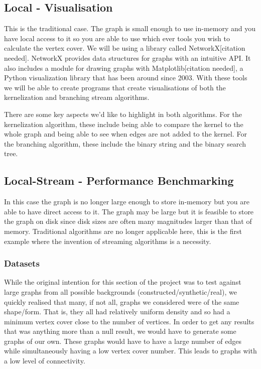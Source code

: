 \subsection{Local - Visualisation}

This is the traditional case. The graph is small enough to use in-memory
and you have local access to it so you are able to use which ever tools
you wish to calculate the vertex cover. We will be using a library
called NetworkX{[}citation needed{]}. NetworkX provides data structures
for graphs with an intuitive API. It also includes a module for drawing
graphs with Matplotlib{[}citation needed{]}, a Python visualization
library that has been around since 2003. With these tools we will be
able to create programs that create visualisations of both the
kernelization and branching stream algorithms.

There are some key aspects we'd like to highlight in both algorithms.
For the kernelization algorithm, these include being able to compare the
kernel to the whole graph and being able to see when edges are not added
to the kernel. For the branching algorithm, these include the binary
string and the binary search tree.


\subsection{Local-Stream - Performance Benchmarking}

In this case the graph is no longer large enough to store in-memory but
you are able to have direct access to it. The graph may be large but it
is feasible to store the graph on disk since disk sizes are often many
magnitudes larger than that of memory. Traditional algorithms are no
longer applicable here, this is the first example where the invention of
streaming algorithms is a necessity.

\subsubsection{Datasets}

While the original intention for this section of the project was to test
against large graphs from all possible backgrounds
(constructed/synthetic/real), we quickly realised that many, if not all,
graphs we considered were of the same shape/form. That is, they all had
relatively uniform density and so had a minimum vertex cover close to
the number of vertices. In order to get any results that was anything
more than a null result, we would have to generate some graphs of our
own. These graphs would have to have a large number of edges while
simultaneously having a low vertex cover number. This leads to graphs
with a low level of connectivity.


